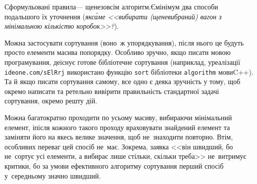 Сформульовані правила\nolinebreak[3] --- ще\nolinebreak[2] не\nolinebreak[3] зовсім алгоритм.\linebreak[1] Є\nolinebreak[3] мінімум два способи подальшого їх уточнення (\emph{як\nolinebreak[3] с\'{а}ме \textsl{<<вибирати (ще\nolinebreak[3] не\nolinebreak[3] вибраний) вагон з мінімальною кількістю коробок>>}?}).

Можна застосувати сортування (воно~ж упорядкування), після нього це будуть просто елементи масива по\nolinebreak[3] порядку. Особливо зручно, якщо писати мовою програмування, де\nolinebreak[2] існує готове бібліотечне сортування (наприклад, у\nolinebreak[3] реалізації \verb"ideone.com/sElRrj" використано функцію \verb"sort" бібліотеки \verb"algorithm" мови\nolinebreak[3] C++). Та й якщо писати сортування самому, все одно є деяка зручність у тому, щоб окремо написати та ретельно вивірити правильність стандартної задачі сортування, окремо решту дій.

Можна багатократно проходити по усьому масиву, вибираючи мінімальний елемент, і\nolinebreak[3] після кожного такого проходу враховувати знайдений елемент та заміняти його на якесь велике значення, щоб не~знаходити повторно. Втім, особливих переваг цей спосіб не~має. Зокрема, заявка <<він швидший, бо не~сортує усі елементи, а вибирає лише стільки, скільки треба>> не~витримує критики, бо за умови ефективного алгоритму сортування перший спосіб у~середньому значно швидший.
